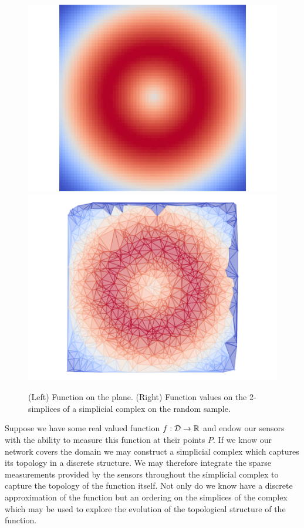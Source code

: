 \begin{figure}[htbp]
\centering
    \includegraphics[scale=0.5]{figures/fgrid.pdf}\hspace{-0.5in}
    \includegraphics[scale=0.5]{figures/fcomplex.pdf}
    \caption{(Left) Function on the plane.
            (Right) Function values on the 2-simplices of a simplicial complex on the random sample.}
    \label{fig:function}
\end{figure}

Suppose we have some real valued function $f:{\mathcal{D}}\to\mathbb{R}$ and endow our sensors with the ability to measure this function at their points $P$.
If we know our network covers the domain we may construct a simplicial complex which captures its topology in a discrete structure.
We may therefore integrate the sparse measurements provided by the sensors throughout the simplicial complex to capture the topology of the function itself.
Not only do we know have a discrete approximation of the function but an ordering on the simplices of the complex which may be used to explore the evolution of the topological structure of the function.


